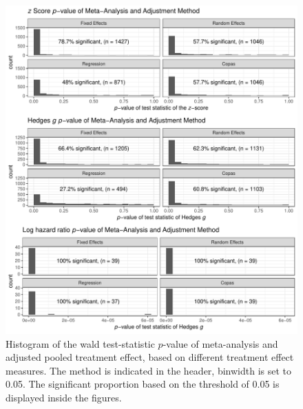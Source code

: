 \documentclass[11pt,a4paper,twoside]{book}\usepackage[]{graphicx}\usepackage[]{color}
\newenvironment{knitrout}{}{} %
\begin{document}
\begin{figure}
\begin{knitrout}
\color{fgcolor}

{\centering \includegraphics[width=\textwidth-3cm]{figure/ch03_figunnamed-chunk-16-1} 

}



\end{knitrout}
\caption{Histogram of the wald test-statistic $p$-value of meta-analysis and adjusted pooled treatment effect, based on different treatment effect measures. The method is indicated in the header, binwidth is set to 0.05. The significant proportion based on the threshold of 0.05 is displayed inside the figures.}
\label{fig:adjustment.stat}
\end{figure}
\end{document}
